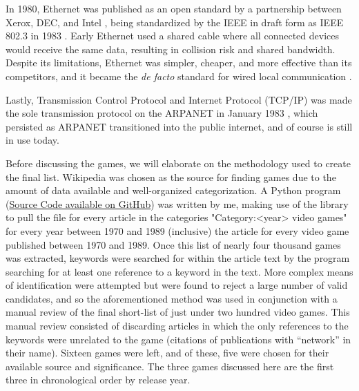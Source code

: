 In 1980, Ethernet was published as an open standard by a partnership between Xerox, DEC, and Intel \cite{DIX} , being standardized by the IEEE in draft form as IEEE 802.3 in 1983 \cite{IEEE8023}. Early Ethernet used a shared cable where all connected devices would receive the same data, resulting in collision risk and shared bandwidth. Despite its limitations, Ethernet was simpler, cheaper, and more effective than its competitors, and it became the \textit{de facto} standard for wired local communication \cite{metcalfe}.

Lastly, Transmission Control Protocol and Internet Protocol (TCP/IP) was made the sole transmission protocol on the ARPANET in January 1983 \cite{flagday}, which persisted as ARPANET transitioned into the public internet, and of course is still in use today.

Before discussing the games, we will elaborate on the methodology used to create the final list. Wikipedia was chosen as the source for finding games due to the amount of data available and well-organized categorization. A Python program (\href{https://github.com/Anidion/wikipedia-scraper}{Source Code available on GitHub}) was written by me, making use of the  library \cite{pywikibot} to pull the  file for every article in the categories "Category:<year> video games" for every year between 1970 and 1989 (inclusive) \ie the article for every video game published between 1970 and 1989. Once this list of nearly four thousand games was extracted, keywords were searched for within the article text by the program searching for at least one reference to a keyword in the text. More complex means of identification were attempted but were found to reject a large number of valid candidates, and so the aforementioned method was used in conjunction with a manual review of the final short-list of just under two hundred video games. This manual review consisted of discarding articles in which the only references to the keywords were unrelated to the game (\eg citations of publications with ``network'' in their name). Sixteen games were left, and of these, five were chosen for their available source and significance. The three games discussed here are the first three in chronological order by release year.
